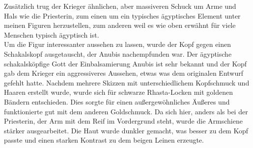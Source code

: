 \documentclass[extern,palatino]{cgBA}
\begin{document}
Zusätzlich trug der Krieger ähnlichen, aber massiveren Schuck um Arme und Hals wie die Priesterin, zum einen um ein typisches ägyptisches Element unter meinen Figuren herzustellen, zum anderen weil es wie oben erwähnt für viele Menschen typisch ägyptisch ist. 
\\Um die Figur interessanter aussehen zu lassen, wurde der Kopf gegen einen Schakalskopf ausgetauscht, der Anubis nachempfunden war. Der ägyptische schakalsköpfige Gott der Einbalsamierung Anubis ist sehr bekannt und der Kopf gab dem Krieger ein aggressiveres Aussehen, etwas was dem originalen Entwurf gefehlt hatte. Nachdem mehrere Skizzen mit unterschiedlichem Kopfschmuck und Haaren erstellt wurde, wurde sich für schwarze Rhasta-Locken mit goldenen Bändern entschieden. Dies sorgte für einen außergewöhnliches Äußeres und funktionierte gut mit dem anderen Goldschmuck.
Da sich hier, anders als bei der Priesterin, der Arm mit dem Reif im Vordergrund steht, wurde die Armschiene stärker ausgearbeitet. Die Haut wurde dunkler gemacht, was besser zu dem Kopf passte und einen starken Kontrast zu dem beigen Leinen erzeugte.
\newpage
\end{document}
